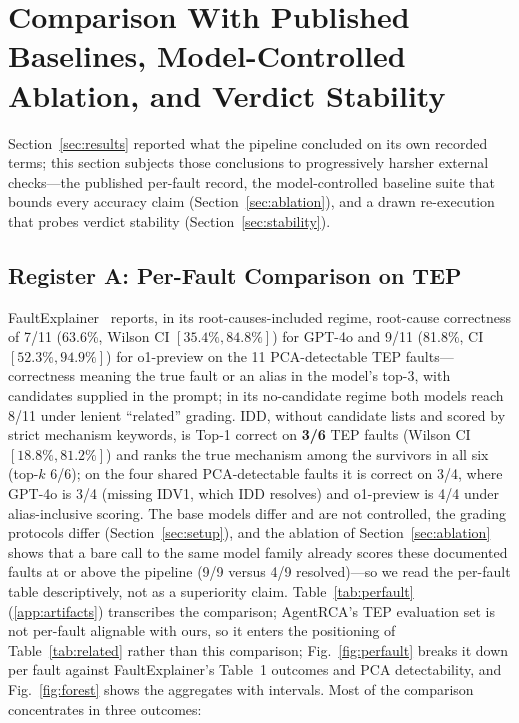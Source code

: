 \documentclass[preprint,10pt]{elsarticle}
\begin{document}
\section{Comparison With Published Baselines, Model-Controlled Ablation, and Verdict Stability}
\label{sec:comparison}

Section~\ref{sec:results} reported what the pipeline concluded on its own recorded terms; this section subjects those conclusions to progressively harsher external checks---the published per-fault record, the model-controlled baseline suite that bounds every accuracy claim (Section~\ref{sec:ablation}), and a drawn re-execution that probes verdict stability (Section~\ref{sec:stability}).

\subsection{Register A: Per-Fault Comparison on TEP}
FaultExplainer~\cite{khan2024faultexplainer} reports, in its root-causes-included regime, root-cause correctness of 7/11 (63.6\%, Wilson CI $[35.4\%,84.8\%]$) for GPT-4o and 9/11 (81.8\%, CI $[52.3\%,94.9\%]$) for o1-preview on the 11 PCA-detectable TEP faults---correctness meaning the true fault or an alias in the model's top-3, with candidates supplied in the prompt; in its no-candidate regime both models reach 8/11 under lenient ``related'' grading. IDD, without candidate lists and scored by strict mechanism keywords, is Top-1 correct on \textbf{3/6} TEP faults (Wilson CI $[18.8\%,81.2\%]$) and ranks the true mechanism among the survivors in all six (top-$k$ 6/6); on the four shared PCA-detectable faults it is correct on 3/4, where GPT-4o is 3/4 (missing IDV1, which IDD resolves) and o1-preview is 4/4 under alias-inclusive scoring. The base models differ and are not controlled, the grading protocols differ (Section~\ref{sec:setup}), and the ablation of Section~\ref{sec:ablation} shows that a bare call to the same model family already scores these documented faults at or above the pipeline (9/9 versus 4/9 resolved)---so we read the per-fault table descriptively, not as a superiority claim. Table~\ref{tab:perfault} (\ref{app:artifacts}) transcribes the comparison; AgentRCA's TEP evaluation set is not per-fault alignable with ours, so it enters the positioning of Table~\ref{tab:related} rather than this comparison; Fig.~\ref{fig:perfault} breaks it down per fault against FaultExplainer's Table~1 outcomes and PCA detectability, and Fig.~\ref{fig:forest} shows the aggregates with intervals. Most of the comparison concentrates in three outcomes:
\end{document}

